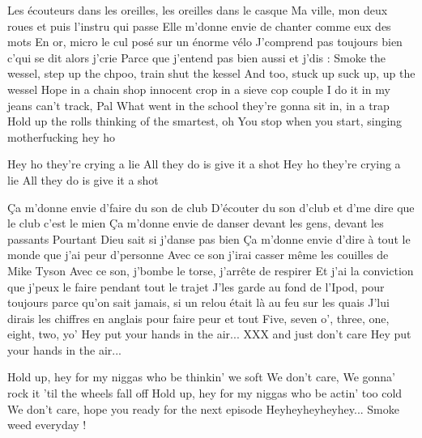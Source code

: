

Les écouteurs dans les oreilles, les oreilles dans le casque
Ma ville, mon deux roues et puis l'instru qui passe
Elle m'donne envie de chanter comme eux des mots
En or, micro le cul posé sur un énorme vélo
J'comprend pas toujours bien c'qui se dit alors j'crie
Parce que j'entend pas bien aussi et j'dis :
Smoke the wessel, step up the chpoo, train shut the kessel
And too, stuck up suck up, up the wessel
Hope in a chain shop innocent crop in a sieve cop couple
I do it in my jeans can't track, Pal
What went in the school they're gonna sit in, in a trap
Hold up the rolls thinking of the smartest, oh
You stop when you start, singing motherfucking hey ho

Hey ho they're crying a lie
All they do is give it a shot
Hey ho they're crying a lie
All they do is give it a shot

Ça m'donne envie d'faire du son de club
D'écouter du son d'club et d'me dire que le club c'est le mien
Ça m'donne envie de danser devant les gens, devant les passants Pourtant Dieu sait si j'danse pas bien
Ça m'donne envie d'dire à tout le monde que j'ai peur d'personne
Avec ce son j'irai casser même les couilles de Mike Tyson
Avec ce son, j'bombe le torse, j'arrête de respirer
Et j'ai la conviction que j'peux le faire pendant tout le trajet J'les garde au fond de l'Ipod, pour toujours parce qu'on sait jamais, si un relou était là au feu sur les quais
J'lui dirais les chiffres en anglais pour faire peur et tout
Five, seven o', three, one, eight, two, yo'
Hey put your hands in the air...
XXX and just don't care
Hey put your hands in the air...

Hold up, hey for my niggas who be thinkin' we soft
We don't care, We gonna' rock it 'til the wheels fall off
Hold up, hey for my niggas who be actin' too cold
We don't care, hope you ready for the next episode
Heyheyheyheyhey... Smoke weed everyday ! 